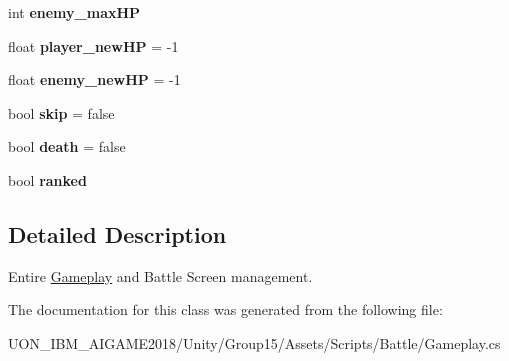 \begin{DoxyCompactItemize}
int {\bfseries enemy\+\_\+max\+HP}
\item 
\mbox{\label{class_gameplay_ab6a745c63842b466d2089a7ee69f2504}} 
float {\bfseries player\+\_\+new\+HP} = -\/1
\item 
\mbox{\label{class_gameplay_a64a0112ee42d349da1f4bf0e0876746f}} 
float {\bfseries enemy\+\_\+new\+HP} = -\/1
\item 
\mbox{\label{class_gameplay_a9218bbfcfe0c3e6392eef67514aa18eb}} 
bool {\bfseries skip} = false
\item 
\mbox{\label{class_gameplay_ab4a9da65b37f32fe2ffd6edb5bc8c25b}} 
bool {\bfseries death} = false
\item 
\mbox{\label{class_gameplay_adceff1461afda5b8b46381c99d315c51}} 
bool {\bfseries ranked}
\end{DoxyCompactItemize}


\subsection{Detailed Description}
Entire \mbox{\hyperlink{class_gameplay}{Gameplay}} and Battle Screen management. 

The documentation for this class was generated from the following file\+:\begin{DoxyCompactItemize}
\item 
U\+O\+N\+\_\+\+I\+B\+M\+\_\+\+A\+I\+G\+A\+M\+E2018/\+Unity/\+Group15/\+Assets/\+Scripts/\+Battle/Gameplay.\+cs\end{DoxyCompactItemize}
